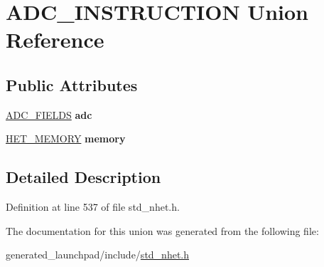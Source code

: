 \hypertarget{unionADC__INSTRUCTION}{}\section{A\+D\+C\+\_\+\+I\+N\+S\+T\+R\+U\+C\+T\+I\+ON Union Reference}
\label{unionADC__INSTRUCTION}
\subsection*{Public Attributes}
\begin{DoxyCompactItemize}
\item 
\mbox{\label{unionADC__INSTRUCTION_aae86e6a07f9b68ebf296733c9899a38d}} 
\mbox{\hyperlink{structADC__format}{A\+D\+C\+\_\+\+F\+I\+E\+L\+DS}} {\bfseries adc}
\item 
\mbox{\label{unionADC__INSTRUCTION_a8535b76695407a89e6a8a1fcf88804de}} 
\mbox{\hyperlink{structmemory__format}{H\+E\+T\+\_\+\+M\+E\+M\+O\+RY}} {\bfseries memory}
\end{DoxyCompactItemize}


\subsection{Detailed Description}


Definition at line 537 of file std\+\_\+nhet.\+h.



The documentation for this union was generated from the following file\+:\begin{DoxyCompactItemize}
\item 
generated\+\_\+launchpad/include/\mbox{\hyperlink{std__nhet_8h}{std\+\_\+nhet.\+h}}\end{DoxyCompactItemize}
